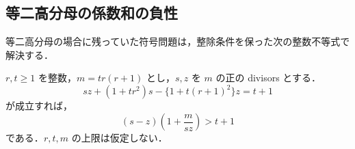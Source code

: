 
\subsection{等二高分母の係数和の負性}
\label{uh11:two-section}

等二高分母の場合に残っていた符号問題は，整除条件を保った次の整数不等式で解決する．

\begin{proposition}[等二高分母の整数不等式]\label{uh11:two-integer-inequality}
$r,t\geq1$ を整数，$m=tr(r+1)$ とし，$s,z$ を $m$ の正の divisors とする．
\begin{equation}\label{uh11:conic}
 sz+(1+tr^2)s-\{1+t(r+1)^2\}z=t+1
\end{equation}
が成立すれば，
\begin{equation}\label{uh11:strict-inequality}
 (s-z)\left(1+\frac{m}{sz}\right)>t+1
\end{equation}
である．$r,t,m$ の上限は仮定しない．
\end{proposition}

